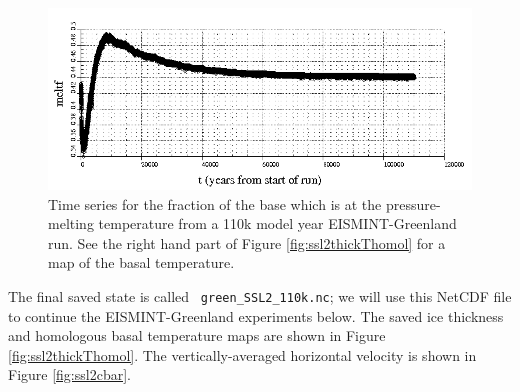 \documentclass[11pt,final]{amsart}
\begin{document}
\begin{figure}[ht]
\includegraphics[width=6.0in,keepaspectratio=true]{figs/eisgrn_meltfseries}
\caption{Time series for the fraction of the base which is at the pressure-melting temperature from a 110k model year EISMINT-Greenland run.  See the right hand part of Figure \ref{fig:ssl2thickThomol} for a map of the basal temperature.}
\label{fig:eisgrnmeltfseries}
\end{figure}

The final saved state is called \verb| green_SSL2_110k.nc|; we will use this NetCDF file to continue the EISMINT-Greenland experiments below.  The saved ice thickness and homologous basal temperature maps are shown in Figure \ref{fig:ssl2thickThomol}.  The vertically-averaged horizontal velocity is shown in Figure \ref{fig:ssl2cbar}.  
\end{document}
